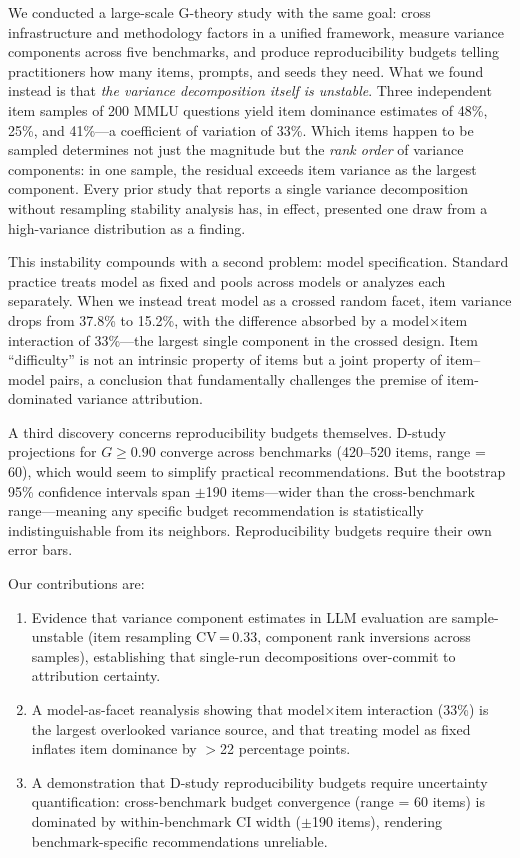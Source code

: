 \documentclass[11pt]{article}
\begin{document}
We conducted a large-scale G-theory study with the same goal: cross infrastructure and methodology factors in a unified framework, measure variance components across five benchmarks, and produce reproducibility budgets telling practitioners how many items, prompts, and seeds they need.
What we found instead is that \emph{the variance decomposition itself is unstable}.
Three independent item samples of 200 MMLU questions yield item dominance estimates of 48\%, 25\%, and 41\%---a coefficient of variation of 33\%.
Which items happen to be sampled determines not just the magnitude but the \emph{rank order} of variance components: in one sample, the residual exceeds item variance as the largest component.
Every prior study that reports a single variance decomposition without resampling stability analysis has, in effect, presented one draw from a high-variance distribution as a finding.

This instability compounds with a second problem: model specification.
Standard practice treats model as fixed and pools across models or analyzes each separately.
When we instead treat model as a crossed random facet, item variance drops from 37.8\% to 15.2\%, with the difference absorbed by a model$\times$item interaction of 33\%---the largest single component in the crossed design.
Item ``difficulty'' is not an intrinsic property of items but a joint property of item--model pairs, a conclusion that fundamentally challenges the premise of item-dominated variance attribution.

A third discovery concerns reproducibility budgets themselves.
D-study projections for $G \geq 0.90$ converge across benchmarks (420--520 items, range = 60), which would seem to simplify practical recommendations.
But the bootstrap 95\% confidence intervals span $\pm$190 items---wider than the cross-benchmark range---meaning any specific budget recommendation is statistically indistinguishable from its neighbors.
Reproducibility budgets require their own error bars.

Our contributions are:
\begin{enumerate}
\item Evidence that variance component estimates in LLM evaluation are sample-unstable (item resampling CV\,=\,0.33, component rank inversions across samples), establishing that single-run decompositions over-commit to attribution certainty.
\item A model-as-facet reanalysis showing that model$\times$item interaction (33\%) is the largest overlooked variance source, and that treating model as fixed inflates item dominance by $>$22 percentage points.
\item A demonstration that D-study reproducibility budgets require uncertainty quantification: cross-benchmark budget convergence (range = 60 items) is dominated by within-benchmark CI width ($\pm$190 items), rendering benchmark-specific recommendations unreliable.
\end{enumerate}
\end{document}
